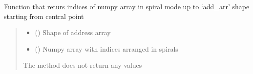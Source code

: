 \documentclass[letterpaper,10pt,english]{sphinxmanual}
\begin{document}
\begin{fulllineitems}
\label{\detokenize{geo_gui:geo_gui.get_addr_spiral_ids}}
\pysigstartsignatures
{}
\pysigstopsignatures
\sphinxAtStartPar
Function that returs indices of numpy array in spiral mode up to ‘add\_arr’ shape starting from central point
\begin{quote}\begin{description}
\begin{itemize}
\item {} 
\sphinxAtStartPar
{} () \textendash{} Shape of address array

\item {} 
\sphinxAtStartPar
{} () \textendash{} Numpy array with indices arranged in spirals

\end{itemize}

\sphinxAtStartPar
{}

\sphinxAtStartPar
The method does not return any values

\end{description}\end{quote}

\end{fulllineitems}

\end{document}
